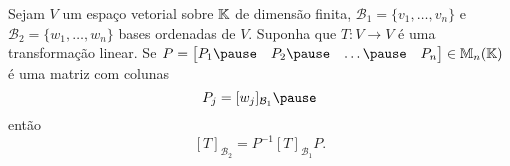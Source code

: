 \documentclass{beamer}
\begin{document}
    \begin{frame}
        \begin{teorema}
            Sejam $V$ um espaço vetorial sobre $\mathbb{K}$ \pause de dimensão finita, \pause $\mathcal{B}_1 = \{v_1,\dots,v_n\}$ \pause e $\mathcal{B}_2 = \{w_1,\dots,w_n\}$ \pause bases ordenadas de $V$. \pause Suponha que $T \colon V \to V$ é uma transformação linear. \pause Se $P = \begin{bmatrix}P_1 \pause & P_2 \pause & \dots \pause & P_n
            \end{bmatrix} \in \cp{M}_n(\cp{K})$ \pause é uma matriz com colunas\pause
            \[
                P_j = [w_j]_{\mathcal{B}_1}\pause
            \]
            então
            \[
                [T]_{\mathcal{B}_2} = P^{-1}[T]_{\mathcal{B}_1}P.
            \]
        \end{teorema}
    \end{frame}
\end{document}
